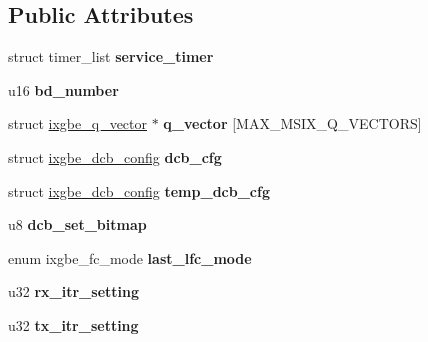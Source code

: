 \subsection*{Public Attributes}
\begin{DoxyCompactItemize}
\item 
\hypertarget{structixgbe__adapter_adc8f146b76b9f01800ce58dd12ffdcb4}{
struct timer\_\-list {\bfseries service\_\-timer}}
\label{structixgbe__adapter_adc8f146b76b9f01800ce58dd12ffdcb4}

\item 
\hypertarget{structixgbe__adapter_a17b4f14f57c0a47704be005f9842f7bd}{
u16 {\bfseries bd\_\-number}}
\label{structixgbe__adapter_a17b4f14f57c0a47704be005f9842f7bd}

\item 
\hypertarget{structixgbe__adapter_ab0461f9e367f1f19d39bea04c9402eb7}{
struct \hyperlink{structixgbe__q__vector}{ixgbe\_\-q\_\-vector} $\ast$ {\bfseries q\_\-vector} \mbox{[}MAX\_\-MSIX\_\-Q\_\-VECTORS\mbox{]}}
\label{structixgbe__adapter_ab0461f9e367f1f19d39bea04c9402eb7}

\item 
\hypertarget{structixgbe__adapter_ae2b48827d3b92e8367adf2001e666575}{
struct \hyperlink{structixgbe__dcb__config}{ixgbe\_\-dcb\_\-config} {\bfseries dcb\_\-cfg}}
\label{structixgbe__adapter_ae2b48827d3b92e8367adf2001e666575}

\item 
\hypertarget{structixgbe__adapter_a0a3477f02cef6bec8547d644a6818251}{
struct \hyperlink{structixgbe__dcb__config}{ixgbe\_\-dcb\_\-config} {\bfseries temp\_\-dcb\_\-cfg}}
\label{structixgbe__adapter_a0a3477f02cef6bec8547d644a6818251}

\item 
\hypertarget{structixgbe__adapter_af9dec7a9f9b586d7d89557beaadb9db9}{
u8 {\bfseries dcb\_\-set\_\-bitmap}}
\label{structixgbe__adapter_af9dec7a9f9b586d7d89557beaadb9db9}

\item 
\hypertarget{structixgbe__adapter_a2585db8fbe0ab89ec4a60bc75423e32e}{
enum ixgbe\_\-fc\_\-mode {\bfseries last\_\-lfc\_\-mode}}
\label{structixgbe__adapter_a2585db8fbe0ab89ec4a60bc75423e32e}

\item 
\hypertarget{structixgbe__adapter_a2e5abbdabe261ace19cb8c8fbb1383d1}{
u32 {\bfseries rx\_\-itr\_\-setting}}
\label{structixgbe__adapter_a2e5abbdabe261ace19cb8c8fbb1383d1}

\item 
\hypertarget{structixgbe__adapter_a1ce582fc4a7d9cf059207509b86e77eb}{
u32 {\bfseries tx\_\-itr\_\-setting}}
\label{structixgbe__adapter_a1ce582fc4a7d9cf059207509b86e77eb}


\end{DoxyCompactItemize}
